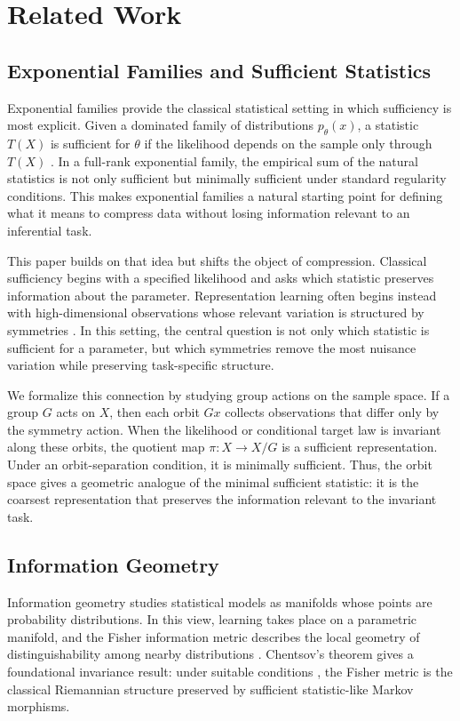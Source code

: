 \documentclass{ssl}
\begin{document}
\section{Related Work}
\subsection{Exponential Families and Sufficient Statistics}
Exponential families provide the classical statistical setting in which sufficiency is most explicit. Given a dominated family of distributions $p_\theta(x)$, a statistic $T(X)$ is sufficient for $\theta$ if the likelihood depends on the sample only through $T(X)$ \cite{casella_statistical_2024, hipp_sufficient_1974}. In a full-rank exponential family, the empirical sum of the natural statistics is not only sufficient but minimally sufficient under standard regularity conditions. This makes exponential families a natural starting point for defining what it means to compress data without losing information relevant to an inferential task.

This paper builds on that idea but shifts the object of compression. Classical sufficiency begins with a specified likelihood and asks which statistic preserves information about the parameter. Representation learning often begins instead with high-dimensional observations whose relevant variation is structured by symmetries \cite{rosebrock_visual_2024}. In this setting, the central question is not only which statistic is sufficient for a parameter, but which symmetries remove the most nuisance variation while preserving task-specific structure. 

We formalize this connection by studying group actions on the sample space. If a group $G$ acts on $X$, then each orbit $Gx$ collects observations that differ only by the symmetry action. When the likelihood or conditional target law is invariant along these orbits, the quotient map $\pi:X\to X/G$ is a sufficient representation. Under an orbit-separation condition, it is minimally sufficient. Thus, the orbit space gives a geometric analogue of the minimal sufficient statistic: it is the coarsest representation that preserves the information relevant to the invariant task.

\subsection{Information Geometry}
Information geometry studies statistical models as manifolds whose points are probability distributions. In this view, learning takes place on a parametric manifold, and the Fisher information metric describes the local geometry of distinguishability among nearby distributions \cite{amari_information_2016, chirikjian_engineering_2000}. Chentsov's theorem gives a foundational invariance result: under suitable conditions \cite{dowty_chentsovs_2017, halverson_naturalness_2026}, the Fisher metric is the classical Riemannian structure preserved by sufficient statistic-like Markov morphisms.
\end{document}
